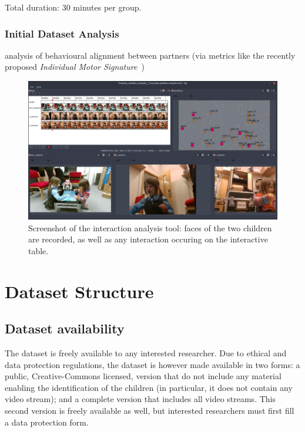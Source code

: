\documentclass{article}
\begin{document}

Total duration: 30 minutes per group.

\subsubsection{Initial Dataset Analysis}

analysis of behavioural alignment between partners (via
metrics like the recently proposed \emph{Individual Motor
Signature}~\cite{slowinski2016dynamic})

\begin{figure}
    \centering
    \includegraphics[width=\linewidth]{analysis}
    \caption{Screenshot of the interaction analysis tool: faces of the two
    children are recorded, as well as any interaction occuring on the
    interactive table.}
    \label{fig|analysis}
\end{figure}

\section{Dataset Structure}

\subsection{Dataset availability}
\label{availability}


The dataset is freely available to any interested researcher. Due to ethical
and data protection regulations, the dataset is however made available in two
forms: a public, Creative-Commons licensed, version that do not include any
material enabling the identification of the children (in particular, it does not
contain any video stream); and a complete version that includes all video
streams. This second version is freely available as well, but interested
researchers must first fill a data protection form.
\end{document}
